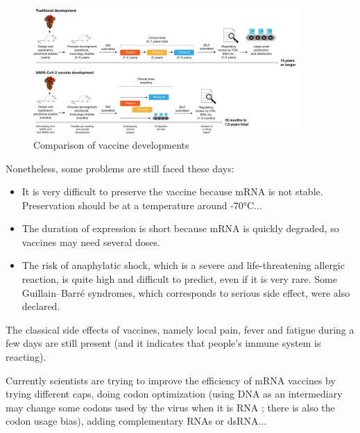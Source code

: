 \documentclass{article}
\begin{document}
            \begin{figure}
                \centering
                \includegraphics[width=0.9\textwidth]{imgs/CovidDev.png}
                \caption{Comparison of vaccine developments \autocite{krammerSARSCoV2VaccinesDevelopment2020}}
                \label{fig:devVaccine}
            \end{figure}

            Nonetheless, some problems are still faced these days:
            \begin{itemize}
                \item It is very difficult to preserve the vaccine because mRNA is not stable. 
                    Preservation should be at a temperature around -70°C...
                \item The duration of expression is short because mRNA is quickly degraded, 
                    so vaccines may need several doses.
                \item The risk of anaphylatic shock, which is a severe and life-threatening allergic reaction, is quite high and difficult to predict, even if it is very rare.
                        Some Guillain–Barré syndromes, which corresponds to serious side effect, were also declared.
            \end{itemize}
            The classical side effects of vaccines, namely local pain, fever and fatigue during a few days are still present
                 (and it indicates that people's immune system is reacting).
            
            Currently scientists are trying to improve the efficiency of mRNA vaccines by trying different caps,
            doing codon optimization (using DNA as an intermediary may change some codons used by the virus when it is RNA ; there is also the codon usage bias),
            adding complementary RNAs or dsRNA... \autocite{MRNATransformativeTechnology}

\end{document}

